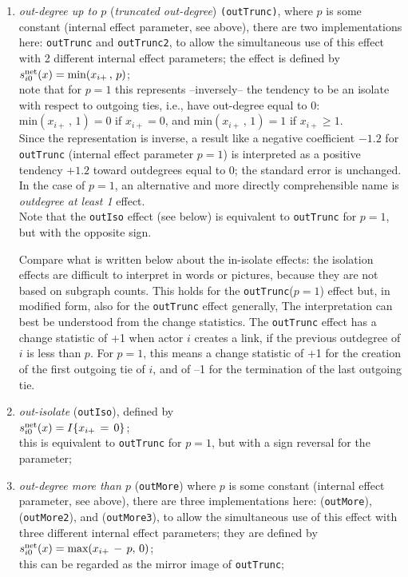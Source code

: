 \documentclass[a4paper,fleqn,11pt]{article}
\newcommand{\+}{\, + \,}
\newcommand{\vit}{\theenumi}
\begin{document}
\begin{enumerate}
 \item {\em out-degree up to $p$} (\emph{truncated out-degree}) \texttt{(outTrunc)},
 where $p$ is some constant
 (internal effect parameter, see above),  there are two implementations here:
 \texttt{outTrunc} and \texttt{outTrunc2}, to allow the simultaneous use of this
 effect with 2 different internal effect parameters; the effect is
 defined by  \\
 $s^{\rm net}_{i\vit}(x) = \text{min}(x_{i+}\,,\, p)$;\\
 note that for $p=1$ this represents --inversely-- the tendency to be an isolate
 with respect to outgoing ties, i.e., have out-degree equal to 0:
 $ \text{min}(x_{i+}\,,\, 1) = 0$ if $x_{i+} = 0$, and
 $ \text{min}(x_{i+}\,,\, 1) = 1$ if $x_{i+} \geq 1$.\\
 Since the representation is inverse, a result like a negative coefficient
 $ -1.2$ for \texttt{outTrunc} (internal effect parameter $p=1$) is interpreted
 as a positive tendency $+1.2$ toward outdegrees equal to 0; the standard
 error is unchanged. In the case of $p=1$, an alternative and more directly
 comprehensible name is \emph{outdegree at least 1} effect.\\
 Note that the \texttt{outIso} effect (see below) is equivalent
 to \texttt{outTrunc} for $p=1$, but with the opposite sign.

 Compare what is written below about the in-isolate effects:
     the isolation effects are difficult to interpret in words or pictures,
     because they are not based on subgraph counts.
 This holds for the \texttt{outTrunc}($p=1$) effect but, in modified form,
 also for the \texttt{outTrunc} effect generally,
 The interpretation can best be understood from the change statistics.
 The \texttt{outTrunc} effect has a change statistic of +1 when actor $i$
 creates a link, if the previous outdegree of $i$ is less than $p$.
 For $p=1$, this means a change statistic of +1 for the creation of the
 first outgoing tie of $i$, and of --1 for the termination of the last outgoing tie.

 \item {\em out-isolate} (\texttt{outIso}), defined by \\
 $s^{\rm net}_{i\vit}(x) = I\{x_{i+} \,=\,  0\}$;\\
 this is equivalent to \texttt{outTrunc} for $p=1$,
 but with a sign reversal for the parameter;


 \item {\em out-degree more than $p$} (\texttt{outMore}) where $p$ is some constant
 (internal effect parameter, see above),
  there are three implementations here:
 (\texttt{outMore}), (\texttt{outMore2}), and (\texttt{outMore3}),
 to allow the simultaneous use of this
 effect with three different internal effect parameters;
 they are defined by \\
 $s^{\rm net}_{i\vit}(x) = \text{max}(x_{i+}\,-\, p, \, 0)$;\\
 this can be regarded as the mirror image of \texttt{outTrunc};
 

\end{enumerate}
\end{document}
